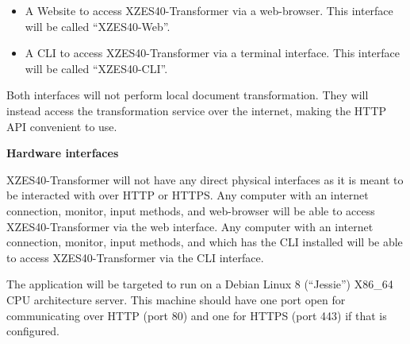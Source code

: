 \begin{itemize}
    \item {
      A Website to access XZES40-Transformer via a web-browser.
      This interface will be called ``XZES40-Web''.
    }
    \item {
      A CLI to access XZES40-Transformer via a terminal interface.
      This interface will be called ``XZES40-CLI''.
    }
\end{itemize}

Both interfaces will not perform local document transformation.
They will instead access the transformation service over the internet, making the HTTP API convenient to use.


\textbf{Hardware interfaces}

XZES40-Transformer will not have any direct physical interfaces as it is meant to be interacted with over HTTP or HTTPS.
Any computer with an internet connection, monitor, input methods, and web-browser will be able to access XZES40-Transformer via the web interface.
Any computer with an internet connection, monitor, input methods, and which has the CLI installed will be able to access XZES40-Transformer via the CLI interface.

The application will be targeted to run on a Debian Linux 8 (``Jessie'') X86\_64 CPU architecture server.
This machine should have one port open for communicating over HTTP (port 80) and one for HTTPS (port 443) if that is configured.



